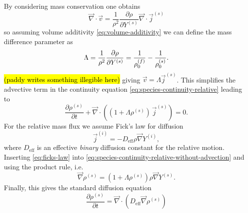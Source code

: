 \documentclass[11pt,twoside]{report}
\begin{document}
By considering mass conservation one obtains
\begin{equation*}
  \vec{\nabla} \cdot \vec{v}
  =
  \frac{1}{\rho^2}
  \frac{\partial \rho}{\partial Y^{(s)}}
  \vec{\nabla} \cdot \vec{j}^{(s)}
\end{equation*}
so assuming volume additivity \eqref{eq:volume-additivity} we can define the mass difference parameter as
\begin{equation}\label{eq:lambda}
  \Lambda
  =
  \frac{1}{\rho^2} \frac{\partial \rho}{\partial Y^{(s)}} \\
  =
  \frac{1}{\rho^{(f)}_0} -
  \frac{1}{\rho^{(s)}_0}.
\end{equation}
\hl{(paddy writes something illegible here)}
giving $\vec{v} = \Lambda \vec{j}^{(s)}$.
This simplifies the advective term in the continuity equation \eqref{eq:species-continuity-relative} leading to
\begin{equation}\label{eq:species-continuity-relative-without-advection}
  \frac{\partial \rho^{(s)}}{\partial t} +
  \vec{\nabla} \cdot \left(
  (1 + \Lambda \rho^{(s)}) \, \vec{j}^{(s)}
  \right) = 0.
\end{equation}
For the relative mass flux we assume Fick's law for diffusion
\begin{equation}\label{eq:ficks-law}
  \vec{j}^{(i)} = -D_\mathrm{eff} \rho \vec{\nabla} Y^{(i)},
\end{equation}
where $D_\mathrm{eff}$ is an effective \emph{binary} diffusion constant for the relative motion.
Inserting \eqref{eq:ficks-law} into \eqref{eq:species-continuity-relative-without-advection} and using the product rule, i.e.\
\begin{equation*}
  \vec{\nabla} \rho^{(s)}
  =
  \left(
  1 +
  \Lambda \rho^{(s)}
  \right)
  \rho
  \vec{\nabla} Y^{(s)}.
\end{equation*}
Finally, this gives the standard diffusion equation
\begin{equation}\label{eq:final-diffusion}
  \frac{\partial \rho^{(s)}}{\partial t}
  =
  \vec{\nabla} \cdot \left(
  D_\mathrm{eff} \vec{\nabla} \rho^{(s)}
  \right)
\end{equation}
\end{document}
